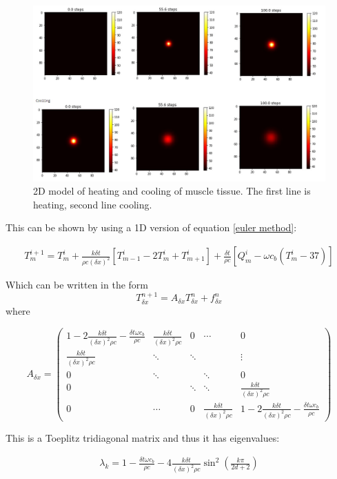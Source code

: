 \documentclass[11pt]{article} %
\begin{document}
\begin{figure}
	\centering
	\includegraphics[width=\linewidth]{"Report_images/2d_homogenous heating and cooling"}
	\caption{2D model of heating and cooling of muscle tissue. The first line is heating, second line cooling.}
	\label{fig:2dhomogenous-heating-and-cooling}
\end{figure}
This can be shown by using a  1D version of equation \ref{euler method}:

\begin{eqnarray}
T^{i+1}_m=T^i_m+\frac{k\delta t}{\rho c (\delta x)^2}[T^i_{m-1}-2T^i_m+T^i_{m+1}]+\frac{\delta t}{\rho c}[Q^i_m-\omega c_b (T^i_m-37)]
\end{eqnarray} 

Which can be written in the form $$ T_{\delta x}^{n+1}=A_{\delta x}T_{\delta x}^{n}+f_{\delta x}^{n} $$
where 

$$ A_{\delta x}= \left( \begin{array}{ccccc}
1- 2\frac{k \delta t}{(\delta x)^2 \rho c} -\frac{\delta t \omega c_b}{\rho c }& \frac{k \delta t}{(\delta x)^2 \rho c} & 0 &\cdots  &0  \\ 
\frac{k \delta t}{(\delta x)^2 \rho c}& \ddots  & \ddots  &  & \vdots \\ 
0& \ddots  &  & \ddots  & 0 \\ 
0&  & \ddots  & \ddots  & \frac{k \delta t}{(\delta x)^2 \rho c} \\ 
0& \cdots &  0&\frac{k \delta t}{(\delta x)^2 \rho c}  & 1- 2\frac{k \delta t}{(\delta x)^2 \rho c} -\frac{\delta t \omega c_b}{\rho c }
\end{array}  \right)  $$

This is a  Toeplitz tridiagonal matrix and thus it has eigenvalues:

\begin{eqnarray}
\lambda_k = 1-\frac{\delta t \omega c_b}{\rho c}-4\frac{k \delta t}{(\delta x)^2 \rho c}\sin^2\left( \frac{k\pi}{2d+2}\right) 
\end{eqnarray}
\end{document}
